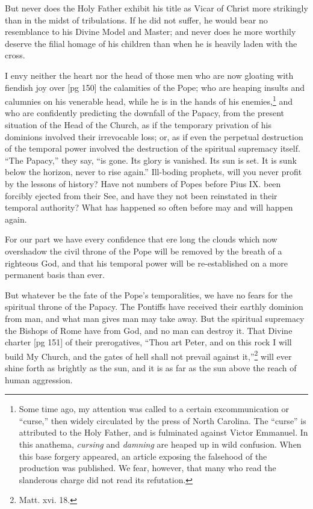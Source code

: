 But never does the Holy Father exhibit his title
as Vicar of Christ more strikingly than in the
midst of tribulations. If he did not suffer, he
would bear no resemblance to his Divine Model
and Master; and never does he more worthily deserve
the filial homage of his children than when
he is heavily laden with the cross.

I envy neither the heart nor the head of those
men who are now gloating with fiendish joy over
[pg 150]
the calamities of the Pope; who are heaping insults
and calumnies on his venerable head, while
he is in the hands of his enemies,\footnote{Some
time ago, my attention was called to a certain excommunication
or “curse,” then widely circulated by the press of
North Carolina. The “curse” is attributed to the Holy Father,
and is fulminated against Victor Emmanuel. In this anathema,
\emph{cursing} and \emph{damning} are heaped up in wild confusion. When
this base forgery appeared, an article exposing the falsehood
of the production was published. We fear, however, that many
who read the slanderous charge did not read its refutation.} and who are
confidently predicting the downfall of the Papacy,
from the present situation of the Head of the
Church, as if the temporary privation of his
dominions involved their irrevocable loss; or, as if
even the perpetual destruction of the temporal
power involved the destruction of the spiritual supremacy
itself. “The Papacy,” they say, “is
gone. Its glory is vanished. Its sun is set. It is
sunk below the horizon, never to rise again.” Ill-boding
prophets, will you never profit by the lessons
of history? Have not numbers of Popes before
Pius IX. been forcibly ejected from their
See, and have they not been reinstated in their
temporal authority? What has happened so often
before may and will happen again.

For our part we have every confidence that ere
long the clouds which now overshadow the civil
throne of the Pope will be removed by the breath
of a righteous God, and that his temporal power
will be re-established on a more permanent basis
than ever.

But whatever be the fate of the Pope's temporalities,
we have no fears for the spiritual
throne of the Papacy. The Pontiffs have received
their earthly dominion from man, and what man
gives man may take away. But the spiritual supremacy
the Bishops of Rome have from God,
and no man can destroy it. That Divine charter
[pg 151]
of their prerogatives, “Thou art Peter, and on
this rock I will build My Church, and the gates of
hell shall not prevail against it,”\footnote{Matt.
xvi. 18.} will ever shine
forth as brightly as the sun, and it is as far as the
sun above the reach of human aggression.

